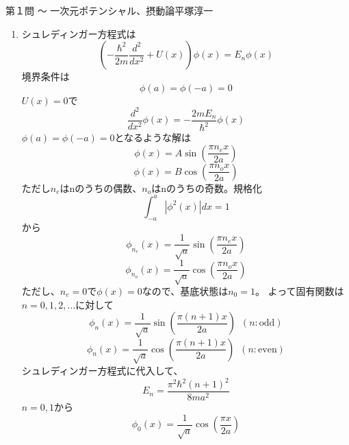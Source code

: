 \begin{answer}{第１問 〜 一次元ポテンシャル、摂動論}{平塚淳一}
\begin{enumerate}
\def\<{\langle}
\def\>{\rangle}
\item シュレディンガー方程式は
  \begin{equation}
  (-\frac{\hbar^2}{2m}\frac{d^2}{dx^2}+U(x))\phi(x)=E_{n}\phi(x)
  \end{equation}
  境界条件は
  \begin{equation}
  \phi(a)=\phi(-a)=0
  \end{equation}
  $U(x)=0$で
  \begin{equation}
  \frac{d^2}{dx^2}\phi(x)=-\frac{2mE_{n}}{\hbar^2}\phi(x)
  \end{equation}
  $\phi(a)=\phi(-a)=0$となるような解は
  \begin{equation}
  \phi(x)=A\sin(\frac{\pi n_{e}x}{2a})
  \end{equation}
  \begin{equation}
  \phi(x)=B\cos(\frac{\pi n_{o}x}{2a})
  \end{equation}
  ただし$n_{e}$はnのうちの偶数、$n_{o}$はnのうちの奇数。規格化
  \begin{equation}
  \int_{-a}^{a}|\phi^2(x)|dx=1
  \end{equation}
  から
  \begin{equation}
  \phi_{n_e}(x)=\frac{1}{\sqrt{a}}\sin(\frac{\pi n_{e}x}{2a})
  \end{equation}
  \begin{equation}
  \phi_{n_o}(x)=\frac{1}{\sqrt{a}}\cos(\frac{\pi n_{o}x}{2a})
  \end{equation}
  ただし、$n_{e}=0$で$\phi(x)=0$なので、基底状態は$n_{0}=1$。
  よって固有関数は$n=0,1,2,...$に対して
  \begin{equation}
  \phi_n(x)=\frac{1}{\sqrt{a}}\sin(\frac{\pi(n+1)x}{2a}) \,\,\,(n:\mathrm{odd})
  \end{equation}
  \begin{equation}
  \phi_n(x)=\frac{1}{\sqrt{a}}\cos(\frac{\pi(n+1)x}{2a}) \,\,\,(n:\mathrm{even})
  \end{equation}
  シュレディンガー方程式に代入して、
  \begin{equation}
  E_{n}=\frac{\pi^2\hbar^2(n+1)^2}{8ma^2}
  \end{equation}
  $n=0,1$から
  \begin{equation}
  \phi_0(x)=\frac{1}{\sqrt{a}}\cos(\frac{\pi x}{2a})
  \end{equation}
  \begin{equation}

\end{equation}
\end{enumerate}
\end{answer}
